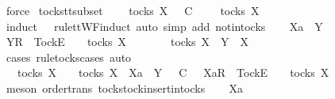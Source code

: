 \ force\isanewline
{}\isamarkupfalse%
%
\endisatagproof
{\isafoldproof}%
%
\isadelimproof
\isanewline
%
\endisadelimproof
\isanewline
{}\isamarkupfalse%
\ tocks{\isacharunderscore}tt{\isacharunderscore}subset{}{\isacharcolon}\isanewline
\ \ {\isachardoublequoteopen}{\isasymsigma}\ {\isasymin}\ tocks\ X\ {\isasymLongrightarrow}\ {\isasymrho}\ {\isasymsubseteq}\isactrlsub C\ {\isasymsigma}\ {\isasymLongrightarrow}\ {\isasymrho}\ {\isasymin}\ tocks\ X{\isachardoublequoteclose}\isanewline
%
\isadelimproof
%
\endisadelimproof
%
\isatagproof
{}\isamarkupfalse%
\ {\isacharparenleft}induct\ {\isasymrho}\ {\isasymsigma}\ rule{\isacharcolon}ttWF{}{\isachardot}induct{\isacharcomma}\ auto\ simp\ add{\isacharcolon}\ notin{\isacharunderscore}tocks{\isacharparenright}\isanewline
\ \ \isamarkupfalse%
\ Xa\ {\isasymrho}\ Y\ {\isasymsigma}\isanewline
\ \ \isamarkupfalse%
\ {\isachardoublequoteopen}{\isacharbrackleft}Y{\isacharbrackright}\isactrlsub R\ {\isacharhash}\ {\isacharbrackleft}Tock{\isacharbrackright}\isactrlsub E\ {\isacharhash}\ {\isasymsigma}\ {\isasymin}\ tocks\ X{\isachardoublequoteclose}\isanewline
\ \ \isamarkupfalse%
\ \isamarkupfalse%
\ {\isachardoublequoteopen}{\isasymsigma}\ {\isasymin}\ tocks\ X\ {\isasymand}\ Y\ {\isasymsubseteq}\ X{\isachardoublequoteclose}\isanewline
\ \ \ \ \isamarkupfalse%
\ {\isacharparenleft}cases\ rule{\isacharcolon}tocks{\isachardot}cases{\isacharcomma}\ auto{\isacharparenright}\isanewline
\ \ \isamarkupfalse%
\ \isamarkupfalse%
\ {\isachardoublequoteopen}{\isacharparenleft}{\isasymsigma}\ {\isasymin}\ tocks\ X\ {\isasymLongrightarrow}\ {\isasymrho}\ {\isasymin}\ tocks\ X{\isacharparenright}\ {\isasymLongrightarrow}\ Xa\ {\isasymsubseteq}\ Y\ {\isasymLongrightarrow}\ {\isasymrho}\ {\isasymsubseteq}\isactrlsub C\ {\isasymsigma}\ {\isasymLongrightarrow}\ {\isacharbrackleft}Xa{\isacharbrackright}\isactrlsub R\ {\isacharhash}\ {\isacharbrackleft}Tock{\isacharbrackright}\isactrlsub E\ {\isacharhash}\ {\isasymrho}\ {\isasymin}\ tocks\ X{\isachardoublequoteclose}\isanewline
\ \ \ \ \isamarkupfalse%
\ {\isacharparenleft}meson\ order{\isachardot}trans\ tocks{\isachardot}tock{\isacharunderscore}insert{\isacharunderscore}in{\isacharunderscore}tocks{\isacharparenright}\isanewline
{}\isamarkupfalse%
\isanewline
\ \ \isamarkupfalse%
\ Xa\ {\isasymrho}\ {\isasymsigma}\isanewline
\ \ \isamarkupfalse%
